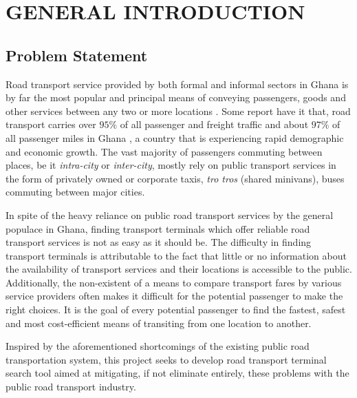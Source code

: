 \documentclass[oneside,12pt]{book}
\begin{document}
\chapter{GENERAL INTRODUCTION}

\section{Problem Statement}
Road transport service provided by both formal and informal sectors in Ghana is by far the most popular and principal means of conveying passengers, goods and other services between any two or more locations \citep{aidoo_passengers_2013}. Some report have it that, road transport carries over $ 95\% $ of all passenger and freight traffic and about $ 97\% $ of all passenger miles in Ghana \citep[p.~195]{unesco_transportation:_????}, a country that is experiencing rapid demographic and economic growth. The vast majority of passengers commuting between places, be it \textit{intra-city} or \textit{inter-city}, mostly rely on public transport services in the form of privately owned or corporate taxis, \textit{tro tros} (shared minivans), buses commuting between major cities.

In spite of the heavy reliance on public road transport services by the general populace in Ghana, finding transport terminals which offer reliable road transport services is not as easy as it should be. The difficulty in finding transport terminals is attributable to the fact that little or no information about the availability of transport services and their locations is accessible to the public. Additionally, the non-existent of a means to compare transport fares by various service providers often makes it difficult for the potential passenger to make the right choices. It is the goal of every potential passenger to find the fastest, safest and most cost-efficient means of transiting from one location to another. 

Inspired by the aforementioned shortcomings of the existing public road transportation system, this project seeks to develop road transport terminal search tool
aimed at mitigating, if not eliminate entirely, these problems with the public road transport industry.
\newpage
\end{document}
